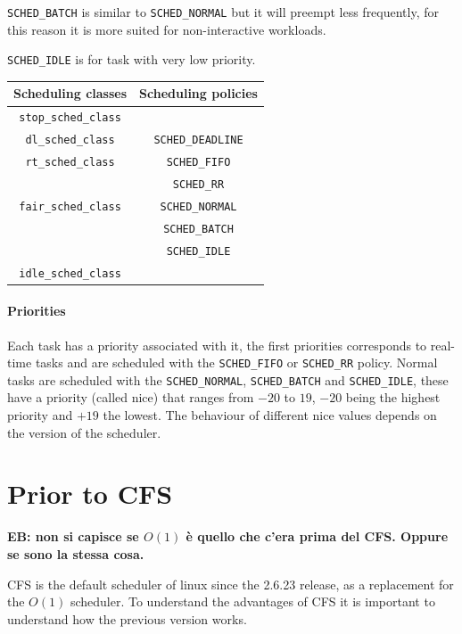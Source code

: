 \documentclass[10pt, oneside]{book}
\newcommand{\mycomment}[1]{\textbf{#1}}  %
\begin{document}
\verb|SCHED_BATCH| is similar to \verb|SCHED_NORMAL| but it will preempt less frequently, for this reason it is more suited for non-interactive workloads.

\verb|SCHED_IDLE| is for task with very low priority.

\begin{tabular}{|c|c|}
\hline
\textbf{Scheduling classes} & \textbf{Scheduling policies}\\
\hline
\texttt{stop\_sched\_class} &\\
\hline
\texttt{dl\_sched\_class}   & \texttt{SCHED\_DEADLINE}\\
\hline
\texttt{rt\_sched\_class}   & \texttt{SCHED\_FIFO} \\
                         & \texttt{SCHED\_RR}\\
\hline
\texttt{fair\_sched\_class} & \texttt{SCHED\_NORMAL}\\
                   & \texttt{SCHED\_BATCH}\\
                   & \texttt{SCHED\_IDLE}\\
\hline
\texttt{idle\_sched\_class} &\\          
\hline
\end{tabular}


\paragraph{Priorities}
Each task has a priority associated with it, the first priorities
corresponds to real-time tasks and are scheduled with the
\verb|SCHED_FIFO| or \verb|SCHED_RR| policy. Normal tasks are
scheduled with the \verb|SCHED_NORMAL|, \verb|SCHED_BATCH| and
\verb|SCHED_IDLE|, these have a priority (called nice) that ranges
from $-20$ to $19$, $-20$ being the highest priority and $+19$ the
lowest. The behaviour of different nice values depends on the version
of the scheduler.

\label{sec:cfs}
\section{Prior to CFS}

\mycomment{EB: non si capisce se $O(1)$ \`e quello che c'era prima del
  CFS. Oppure se sono la stessa cosa.}

CFS is the default scheduler of linux since the 2.6.23 release, as a replacement for the $O(1)$ scheduler. To understand the advantages of CFS it is important to understand how the previous version works.
\end{document}
